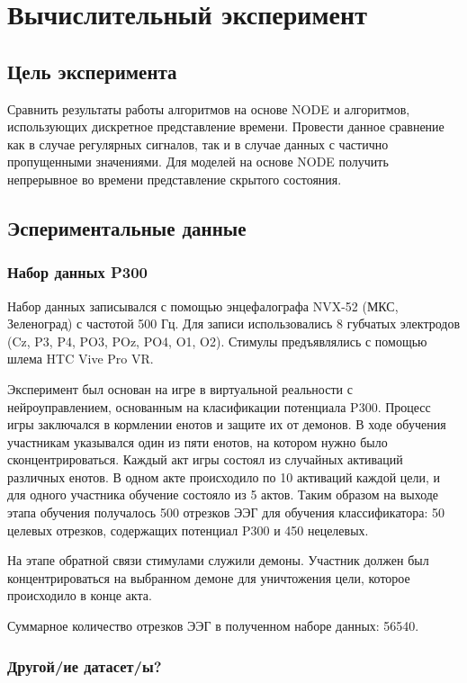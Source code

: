 \documentclass{article}
\begin{document}
\section{Вычислительный эксперимент}

\subsection{Цель эксперимента}

Сравнить результаты работы алгоритмов на основе NODE и алгоритмов, использующих дискретное представление времени. Провести данное сравнение как в случае регулярных сигналов, так и в случае данных с частично пропущенными значениями. Для моделей на основе NODE получить непрерывное во времени представление скрытого состояния.

\subsection{Эспериментальные данные}

\subsubsection{Набор данных P300}

Набор данных записывался с помощью энцефалографа NVX-52 (МКС, Зеленоград) с частотой 500 Гц. Для записи использовались 8 губчатых электродов (Cz, P3, P4, PO3, POz, PO4, O1, O2). Стимулы предъявлялись
с помощью шлема HTC Vive Pro VR.

Эксперимент был основан на игре в виртуальной реальности с нейроуправлением, основанным на класификации потенциала P300. Процесс игры заключался в кормлении енотов и защите их от демонов. В ходе обучения участникам указывался один из пяти енотов, на котором нужно было сконцентрироваться. Каждый акт игры состоял из случайных активаций различных енотов. В одном акте происходило по 10 активаций каждой цели, и для одного участника обучение состояло из 5 актов. Таким образом на выходе этапа обучения получалось 500 отрезков ЭЭГ для обучения классификатора: 50 целевых отрезков, содержащих потенциал P300 и 450 нецелевых.

На этапе обратной связи стимулами служили демоны. Участник должен был концентрироваться на выбранном демоне для уничтожения цели, которое происходило в конце акта.

Суммарное количество отрезков ЭЭГ в полученном наборе данных: 56540.

\subsubsection{Другой/ие датасет/ы?}
\end{document}
